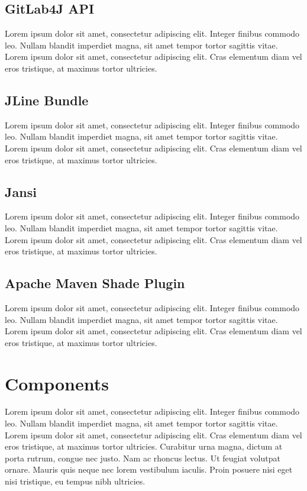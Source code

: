 \documentclass[
  digital,     %
  oneside,     %
  nosansbold,  %
  nocolorbold, %
  lof,         %
  lot,         %
]{fithesis4}
\begin{document}
\subsection{GitLab4J API}
Lorem ipsum dolor sit amet, consectetur adipiscing elit. Integer finibus commodo leo. Nullam blandit imperdiet magna, sit amet tempor tortor sagittis vitae. Lorem ipsum dolor sit amet, consectetur adipiscing elit. Cras elementum diam vel eros tristique, at maximus tortor ultricies.

\subsection{JLine Bundle}
Lorem ipsum dolor sit amet, consectetur adipiscing elit. Integer finibus commodo leo. Nullam blandit imperdiet magna, sit amet tempor tortor sagittis vitae. Lorem ipsum dolor sit amet, consectetur adipiscing elit. Cras elementum diam vel eros tristique, at maximus tortor ultricies.

\subsection{Jansi}
Lorem ipsum dolor sit amet, consectetur adipiscing elit. Integer finibus commodo leo. Nullam blandit imperdiet magna, sit amet tempor tortor sagittis vitae. Lorem ipsum dolor sit amet, consectetur adipiscing elit. Cras elementum diam vel eros tristique, at maximus tortor ultricies.

\subsection{Apache Maven Shade Plugin}
Lorem ipsum dolor sit amet, consectetur adipiscing elit. Integer finibus commodo leo. Nullam blandit imperdiet magna, sit amet tempor tortor sagittis vitae. Lorem ipsum dolor sit amet, consectetur adipiscing elit. Cras elementum diam vel eros tristique, at maximus tortor ultricies.
\shorthandon{-}

\section{Components}
Lorem ipsum dolor sit amet, consectetur adipiscing elit. Integer finibus commodo leo. Nullam blandit imperdiet magna, sit amet tempor tortor sagittis vitae. Lorem ipsum dolor sit amet, consectetur adipiscing elit. Cras elementum diam vel eros tristique, at maximus tortor ultricies. Curabitur urna magna, dictum at porta rutrum, congue nec justo. Nam ac rhoncus lectus. Ut feugiat volutpat ornare. Mauris quis neque nec lorem vestibulum iaculis. Proin posuere nisi eget nisi tristique, eu tempus nibh ultricies.
\end{document}
